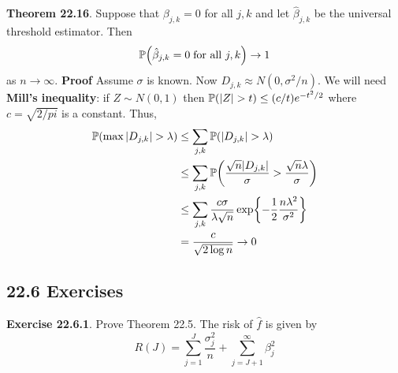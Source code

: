 \textbf{Theorem 22.16}. Suppose that \(\beta_{j, k} = 0\) for all
\(j, k\) and let \(\hat{\beta}_{j, k}\) be the universal threshold
estimator. Then
\[
\PROB\left(\hat{\beta}_{j, k} = 0 \; \text{for all } j, k \right) \rightarrow 1
\]
as \(n \rightarrow \infty\).
\textbf{Proof} Assume \(\sigma\) is known. Now
\(D_{j, k} \approx N(0, \sigma^{2} / n)\). We will need \textbf{Mill's
inequality}: if \(Z \sim N(0, 1)\) then
\(\operatorname{\mathbb{P}}(|Z| > t) \leq (c / t) e^{-t^{2} / 2}\) where
\(c = \sqrt{2 / pi}\) is a constant. Thus,
\begin{align*}
\PROB(\max |D_{j, k}| > \lambda) &\leq \sum_{j, k} \PROB(|D_{j, k}| > \lambda) \\
& \leq \sum_{j, k} \PROB \left( \frac{\sqrt{n} |D_{j, k}|}{\sigma} > \frac{\sqrt{n} \lambda}{\sigma} \right) \\
& \leq \sum_{j, k} \frac{c \sigma}{\lambda \sqrt{n}} \exp \left\{ - \frac{1}{2} \frac{n \lambda^{2}}{\sigma^{2}} \right\} \\
& = \frac{c}{\sqrt{2 \log n}} \rightarrow 0
\end{align*}

\subsection*{22.6 Exercises}

\textbf{Exercise 22.6.1}. Prove Theorem 22.5.
The risk of \(\hat{f}\) is given by
\[
R(J) = \sum_{j=1}^J \frac{\sigma_{j}^{2}}{n} + \sum_{j=J+1}^{\infty} \beta_{j}^{2}
\]

